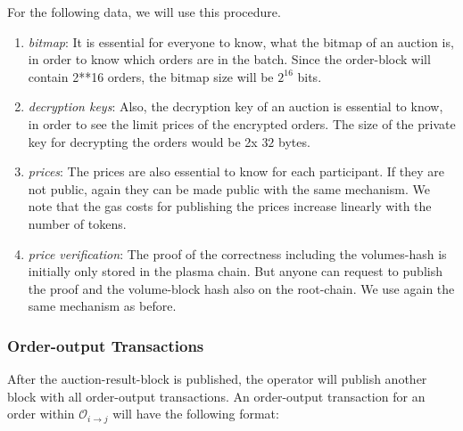\documentclass[11pt,parskip=full]{scrartcl}%
\def\pO{\mathcal{O}}
\def\ra{\rightarrow}
\begin{document}
For the following data, we will use this procedure.
\begin{enumerate}
\item \emph{bitmap}:
It is essential for everyone to know, what the bitmap of an auction is, in order to know which orders are in the batch. Since the order-block will contain 2**16 orders, the bitmap size will be $2^{16}$ bits. 


\item \emph{decryption keys}:
Also, the decryption key of an auction is essential to know, in order to see the limit prices of the encrypted orders. 
The size of the private key for decrypting the orders would be 2x $32$ bytes.

\item \emph{prices}:
The prices are also essential to know for each participant. 
If they are not public, again they can be made public with the same mechanism. 
We note that the gas costs for publishing the prices increase linearly with the number of tokens.

\item \emph{price verification}:
The proof of the correctness including the volumes-hash is initially only stored in the plasma chain. 
But anyone can request to publish the proof and the volume-block hash also on the root-chain. 
We use again the same mechanism as before. 
\end{enumerate}

\subsubsection{Order-output Transactions}
After the auction-result-block is published, the operator will publish another block with all order-output transactions. 
An order-output transaction for an order within $\pO_{i\ra j}$ will have the following format:
\end{document}
